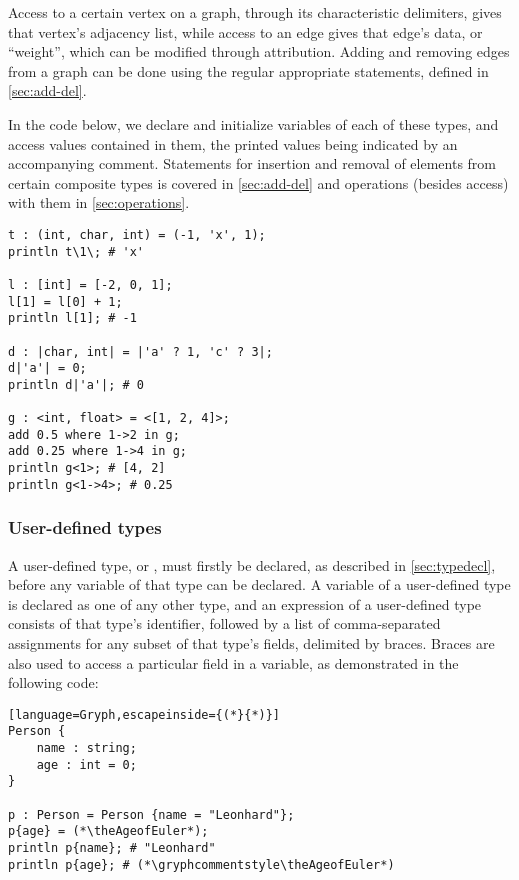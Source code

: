 Access to a certain vertex on a graph, through its characteristic delimiters, gives that vertex's adjacency list, while access to an edge gives that edge's data, or ``weight'', which can be modified through attribution. Adding and removing edges from a graph can be done using the regular appropriate statements, defined in \ref{sec:add-del}.

In the code below, we declare and initialize variables of each of these types, and access values contained in them, the printed values being indicated by an accompanying comment. Statements for insertion and removal of elements from certain composite types is covered in \ref{sec:add-del} and operations (besides access) with them in \ref{sec:operations}.
\begin{lstlisting}[language=Gryph]
t : (int, char, int) = (-1, 'x', 1);
println t\1\; # 'x'

l : [int] = [-2, 0, 1];
l[1] = l[0] + 1;
println l[1]; # -1

d : |char, int| = |'a' ? 1, 'c' ? 3|;
d|'a'| = 0;
println d|'a'|; # 0

g : <int, float> = <[1, 2, 4]>;
add 0.5 where 1->2 in g;
add 0.25 where 1->4 in g;
println g<1>; # [4, 2]
println g<1->4>; # 0.25
\end{lstlisting}
\subsubsection{User-defined types}
\label{sec:usertypes}
A user-defined type, or , must firstly be declared, as described in \ref{sec:typedecl}, before any variable of that type can be declared. A variable of a user-defined type is declared as one of any other type, and an expression of a user-defined type consists of that type's identifier, followed by a list of comma-separated assignments for any subset of that type's fields, delimited by braces. Braces are also used to access a particular field in a  variable, as demonstrated in the following code:
\setcounter{AgeofEuler}{\year-1707}
\begin{lstlisting}[language=Gryph,escapeinside={(*}{*)}]
Person {
	name : string;
	age : int = 0;
}

p : Person = Person {name = "Leonhard"};
p{age} = (*\theAgeofEuler*);
println p{name}; # "Leonhard"
println p{age}; # (*\gryphcommentstyle\theAgeofEuler*)
\end{lstlisting}